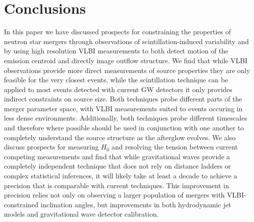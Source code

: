 \section{Conclusions}
In this paper we have discussed prospects for constraining the properties of neutron star mergers through observations of scintillation-induced variability and by using high resolution VLBI measurements to both detect motion of the emission centroid and directly image outflow structure. We find that while VLBI observations provide more direct measurements of source properties they are only feasible for the very closest events, while the scintillation technique can be applied to most events detected with current GW detectors it only provides indirect constraints on source size. Both techniques probe different parts of the merger parameter space, with VLBI measurements suited to events occuring in less dense environments. Additionally, both techniques probe different timescales and therefore where possible should be used in conjunction with one another to completely understand the source structure as the afterglow evolves. We also discuss prospects for measuring $H_0$ and resolving the tension between current competing measurements and find that while gravitational waves provide a completely independent technique that does not rely on distance ladders or complex statistical inferences, it will likely take at least a decade to achieve a precision that is comparable with current techniques. This improvement in precision relies not only on observing a larger population of mergers with VLBI-constrained inclination angles, but improvements in both hydrodynamic jet models and gravitational wave detector calibration.